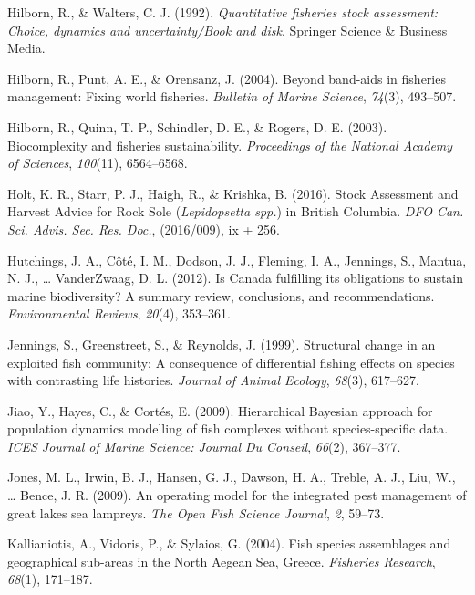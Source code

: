 \documentclass[12pt,]{scrartcl}
\begin{document}
\hypertarget{ref-hilborn1992quantitative}{}
Hilborn, R., \& Walters, C. J. (1992). \emph{Quantitative fisheries
stock assessment: Choice, dynamics and uncertainty/Book and disk}.
Springer Science \& Business Media.

\hypertarget{ref-hilborn2004beyond}{}
Hilborn, R., Punt, A. E., \& Orensanz, J. (2004). Beyond band-aids in
fisheries management: Fixing world fisheries. \emph{Bulletin of Marine
Science}, \emph{74}(3), 493--507.

\hypertarget{ref-hilborn2003biocomplexity}{}
Hilborn, R., Quinn, T. P., Schindler, D. E., \& Rogers, D. E. (2003).
Biocomplexity and fisheries sustainability. \emph{Proceedings of the
National Academy of Sciences}, \emph{100}(11), 6564--6568.

\hypertarget{ref-holt2016stock-asse}{}
Holt, K. R., Starr, P. J., Haigh, R., \& Krishka, B. (2016). Stock
Assessment and Harvest Advice for Rock Sole (\emph{Lepidopsetta spp.})
in British Columbia. \emph{DFO Can. Sci. Advis. Sec. Res. Doc.},
(2016/009), ix + 256.

\hypertarget{ref-hutchings2012canada}{}
Hutchings, J. A., Côté, I. M., Dodson, J. J., Fleming, I. A., Jennings,
S., Mantua, N. J., \ldots{} VanderZwaag, D. L. (2012). Is Canada
fulfilling its obligations to sustain marine biodiversity? A summary
review, conclusions, and recommendations. \emph{Environmental Reviews},
\emph{20}(4), 353--361.

\hypertarget{ref-jennings1999structural}{}
Jennings, S., Greenstreet, S., \& Reynolds, J. (1999). Structural change
in an exploited fish community: A consequence of differential fishing
effects on species with contrasting life histories. \emph{Journal of
Animal Ecology}, \emph{68}(3), 617--627.

\hypertarget{ref-jiao2009hierarchical}{}
Jiao, Y., Hayes, C., \& Cortés, E. (2009). Hierarchical Bayesian
approach for population dynamics modelling of fish complexes without
species-specific data. \emph{ICES Journal of Marine Science: Journal Du
Conseil}, \emph{66}(2), 367--377.

\hypertarget{ref-jones2009operating}{}
Jones, M. L., Irwin, B. J., Hansen, G. J., Dawson, H. A., Treble, A. J.,
Liu, W., \ldots{} Bence, J. R. (2009). An operating model for the
integrated pest management of great lakes sea lampreys. \emph{The Open
Fish Science Journal}, \emph{2}, 59--73.

\hypertarget{ref-kallianiotis2004fish}{}
Kallianiotis, A., Vidoris, P., \& Sylaios, G. (2004). Fish species
assemblages and geographical sub-areas in the North Aegean Sea, Greece.
\emph{Fisheries Research}, \emph{68}(1), 171--187.
\end{document}
